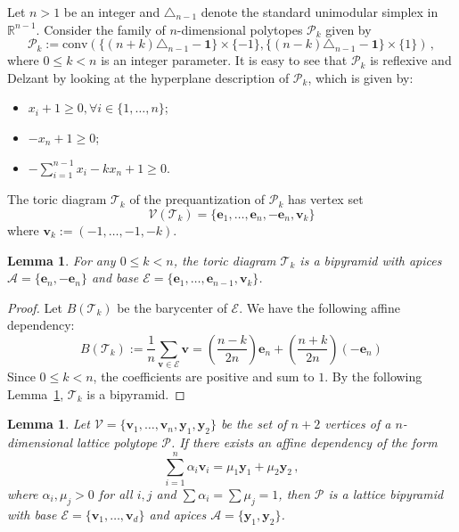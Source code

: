 \documentclass[a4paper,11pt,reqno]{amsart}
\newcommand{\Aa}{{\mathcal A}}
\newcommand{\Vv}{{\mathcal V}}
\newcommand{\Ee}{{\mathcal E}}
\newcommand{\Pp}{{\mathcal P}}
\newtheorem{lemma}[theorem]{Lemma}
\begin{document}
Let $n > 1$ be an integer and $\triangle_{n-1}$ denote the standard unimodular simplex in $\mathbb{R}^{n-1}$.
Consider the family of $n$-dimensional polytopes $\mathcal{P}_k$ given by
\[
\mathcal{P}_k := \text{conv}\left( \{(n+k)\triangle_{n-1} - \bm{1}\} \times \{-1\}, \{(n-k)\triangle_{n-1} - \bm{1}\}  \times \{1\} \right)\,,
\]
where $0 \leq k < n$ is an integer parameter. It is easy to see that $\mathcal{P}_k$ is reflexive and Delzant by 
looking at the hyperplane description of $\mathcal{P}_k$, which is given by:
\begin{itemize}
\item $x_i +1 \geq 0, \forall i \in \{1, \dots, n \}$;
\item $- x_n + 1 \geq 0$;
\item $-\sum_{i=1}^{n-1} x_i- k x_n  +1 \geq 0$.
\end{itemize}
The toric diagram $\mathcal{T}_k$ of the prequantization of $\mathcal{P}_k$ has vertex set
\[
\Vv (\mathcal{T}_k) = \{ \bm{e}_1, \dots, \bm{e}_n, -\bm{e}_n, \bm{v}_k \} 
\]
where $\bm{v}_k := (-1, \dots, -1, -k)$.
\begin{lemma} \label{lemma:dependencyreflexive}
For any $0 \le k < n$, the toric diagram $\mathcal{T}_k$ is a bipyramid with apices $\Aa = \{\bm{e}_n, -\bm{e}_n\}$ and 
base $\Ee = \{\bm{e}_1, \dots, \bm{e}_{n-1}, \bm{v}_k\}$.
\end{lemma}
\begin{proof}
Let $B(\mathcal{T}_k)$ be the barycenter of $\Ee$. We have the following affine dependency:
\[
B(\mathcal{T}_k) := \frac{1}{n} \sum_{\bm{v} \in \Ee} \bm{v} = 
\left(\frac{n-k}{2n}\right) \bm{e}_n + \left(\frac{n+k}{2n}\right) (-\bm{e}_n)
\]
Since $0 \le k < n$, the coefficients are positive and sum to $1$. 
By the following Lemma~\ref{lemma:radonpartition}, $\mathcal{T}_k$ is a bipyramid.
\end{proof}
\begin{lemma} \label{lemma:radonpartition}
Let $\Vv = \{\bm{v}_1, \dots, \bm{v}_n, \bm{y}_1, \bm{y}_2\}$ be the set of $n+2$ vertices of a $n$-dimensional lattice polytope 
$\Pp$. If there exists an affine dependency of the form
\[
\sum_{i=1}^n \alpha_i \bm{v}_i = \mu_1 \bm{y}_1 + \mu_2 \bm{y}_2 \,,
\]
where $\alpha_i, \mu_j > 0$ for all $i, j$ and $\sum \alpha_i = \sum \mu_j = 1$, then $\Pp$ is a lattice bipyramid with base 
$\Ee = \{\bm{v}_1, \dots, \bm{v}_d\}$ and apices $\Aa = \{\bm{y}_1, \bm{y}_2\}$.
\end{lemma}
\end{document}
